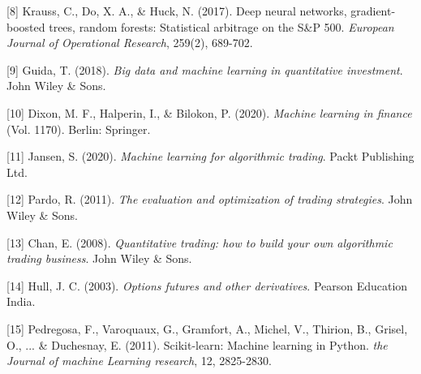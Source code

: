 \documentclass[12pt]{article}
\begin{document}
[8] Krauss, C., Do, X. A., \& Huck, N. (2017). Deep neural networks, gradient-boosted trees, random forests: Statistical arbitrage on the S\&P 500. \textit{European Journal of Operational Research}, 259(2), 689-702.

[9] Guida, T. (2018). \textit{Big data and machine learning in quantitative investment}. John Wiley \& Sons.

[10] Dixon, M. F., Halperin, I., \& Bilokon, P. (2020). \textit{Machine learning in finance} (Vol. 1170). Berlin: Springer.

[11] Jansen, S. (2020). \textit{Machine learning for algorithmic trading}. Packt Publishing Ltd.

[12] Pardo, R. (2011). \textit{The evaluation and optimization of trading strategies}. John Wiley \& Sons.

[13] Chan, E. (2008). \textit{Quantitative trading: how to build your own algorithmic trading business}. John Wiley \& Sons.

[14] Hull, J. C. (2003). \textit{Options futures and other derivatives}. Pearson Education India.

[15] Pedregosa, F., Varoquaux, G., Gramfort, A., Michel, V., Thirion, B., Grisel, O., ... \& Duchesnay, E. (2011). Scikit-learn: Machine learning in Python. \textit{the Journal of machine Learning research}, 12, 2825-2830.
\end{document}
